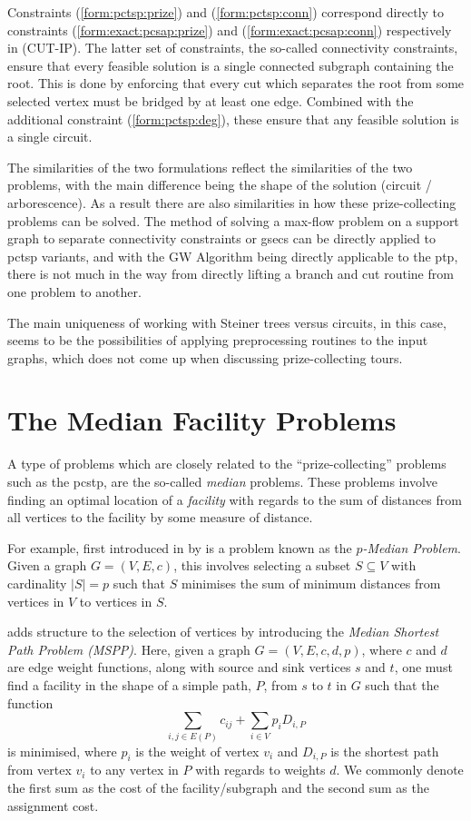 Constraints (\ref{form:pctsp:prize}) and (\ref{form:pctsp:conn}) correspond directly to constraints
 (\ref{form:exact:pcsap:prize}) and (\ref{form:exact:pcsap:conn}) respectively in (CUT-IP).
 The latter set of constraints, the so-called connectivity constraints, ensure that every feasible solution
 is a single connected subgraph containing the root.
 This is done by enforcing that every cut which separates the root from some selected vertex
 must be bridged by at least one edge.
 Combined with the
 additional constraint (\ref{form:pctsp:deg}), these ensure that any feasible solution is a single circuit.

 The similarities of the two formulations reflect the similarities of the two problems, with the main difference being
 the shape of the solution (circuit / arborescence).
 As a result there are also similarities in how these prize-collecting problems can be solved.
 The method of solving a max-flow problem on a support graph
 to separate connectivity constraints or \glspl{gsec} can
 be directly applied to \gls{pctsp} variants, and with the GW Algorithm being
 directly applicable to the \gls{ptp},
 there is not much in the way from directly lifting a branch and cut routine from
 one problem to another.

 The main uniqueness of working with Steiner trees versus
 circuits, in this case, seems to be the possibilities of applying
 preprocessing routines to the input graphs, which does not come up
 when discussing prize-collecting tours.

 \section{The Median Facility Problems}
 \label{sec:related:median}
 A type of problems which are closely related to the
 ``prize-collecting'' problems such as the \gls{pcstp}, are the so-called
 \textit{median} problems.
 These problems involve finding an optimal location of a \textit{facility}
 with regards to the sum
 of distances from all vertices to the facility by some measure of
 distance.

 For example, first introduced in \citeyear{hakimi1964optimum}
 by \citet{hakimi1964optimum} is a problem known as
 the \textit{$p$-Median Problem}.
 Given a graph $G = (V, E, c)$, this involves selecting a subset $S \subseteq V$ with
 cardinality $|S| = p$ such that $S$ minimises the sum of minimum distances
 from vertices in $V$ to vertices in $S$.
 
 \citet{current1987median} adds structure to the selection of vertices by introducing the \textit{Median Shortest Path Problem (MSPP)}.
 Here, given a graph $G = (V,E,c,d,p)$,
 where $c$ and $d$ are edge weight functions,
 along with source and sink vertices $s$ and $t$,
 one must find a facility
 in the shape of a simple path, $P$,
 from $s$ to $t$ in $G$
 such that the function
 \[\sum_{i,j \in E(P)} c_{ij} + \sum_{i \in V} p_i D_{i, P}\]
 is minimised,
 where $p_i$ is the weight of vertex $v_i$ and
 $D_{i, P}$ is the shortest path from vertex $v_i$ to any vertex in $P$ with regards to
 weights $d$.
 We commonly denote the first sum as the cost of the facility/subgraph and the second sum as the assignment cost.

